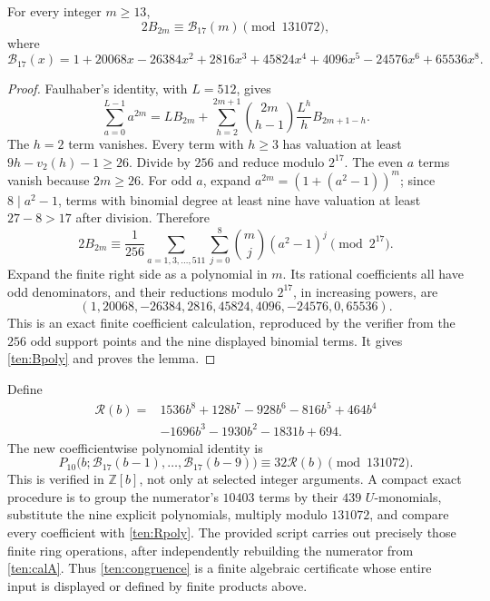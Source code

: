 \begin{lemma}\label{ten:B17}
For every integer $m\ge13$,
\[
 2B_{2m}\equiv\mathcal B_{17}(m)\pmod{131072},
\]
where
\begin{equation}\label{ten:Bpoly}
 \mathcal B_{17}(x)=1+20068x-26384x^2+2816x^3+45824x^4
             +4096x^5-24576x^6+65536x^8.
\end{equation}
\end{lemma}
\begin{proof}
Faulhaber's identity, with $L=512$, gives
\[
 \sum_{a=0}^{L-1}a^{2m}
 =LB_{2m}+\sum_{h=2}^{2m+1}
      \binom{2m}{h-1}\frac{L^h}{h}B_{2m+1-h}.
\]
The $h=2$ term vanishes.  Every term with $h\ge3$ has valuation
at least $9h-v_2(h)-1\ge26$.  Divide by $256$ and reduce modulo
$2^{17}$.  The even $a$ terms vanish because $2m\ge26$.
For odd $a$, expand
$a^{2m}=(1+(a^2-1))^m$; since $8\mid a^2-1$, terms with
binomial degree at least nine have valuation at least $27-8>17$
after division.  Therefore
\begin{equation}\label{ten:finite-average}
 2B_{2m}\equiv\frac1{256}
 \sum_{a=1,3,\ldots,511}\sum_{j=0}^{8}
          \binom mj(a^2-1)^j\pmod{2^{17}}.
\end{equation}
Expand the finite right side as a polynomial in $m$.  Its rational
coefficients all have odd denominators, and their reductions modulo
$2^{17}$, in increasing powers, are
\[
 (1,20068,-26384,2816,45824,4096,-24576,0,65536).
\]
This is an exact finite coefficient calculation, reproduced by the
verifier from the $256$ odd support points and the nine displayed
binomial terms.  It gives \eqref{ten:Bpoly} and proves the lemma.
\end{proof}

Define
\begin{equation}\label{ten:Rpoly}
 \begin{split}
 \mathcal R(b)={}&1536b^8+128b^7-928b^6-816b^5+464b^4\\
                 &-1696b^3-1930b^2-1831b+694.
 \end{split}
\end{equation}
The new coefficientwise polynomial identity is
\begin{equation}\label{ten:congruence}
 P_{10}\bigl(b;\mathcal B_{17}(b-1),\ldots,
                    \mathcal B_{17}(b-9)\bigr)
       \equiv32\mathcal R(b)\pmod{131072}.
\end{equation}
This is verified in $\mathbb Z[b]$, not only at selected integer
arguments.  A compact exact procedure is to group the numerator's
$10403$ terms by their $439$ $U$-monomials, substitute the nine
explicit polynomials, multiply modulo $131072$, and compare every
coefficient with \eqref{ten:Rpoly}.  The provided script carries
out precisely those finite ring operations, after independently
rebuilding the numerator from \eqref{ten:calA}.  Thus
\eqref{ten:congruence} is a finite algebraic certificate whose
entire input is displayed or defined by finite products above.

